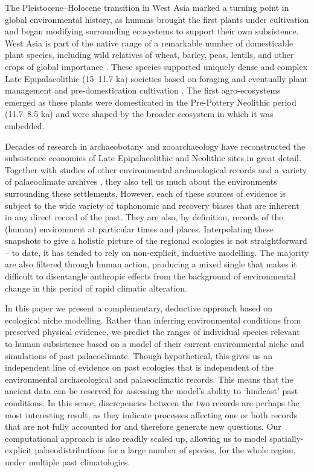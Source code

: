 \documentclass[
  authoryear,
  preprint]{elsarticle}
\begin{document}
The Pleistocene--Holocene transition in West Asia marked a turning point
in global environmental history, as humans brought the first plants
under cultivation and began modifying surrounding ecosystems to support
their own subsistence. West Asia is part of the native range of a
remarkable number of domesticable plant species, including wild
relatives of wheat, barley, peas, lentils, and other crops of global
importance \citep{HarlanZohary1966, Diamond2002, ZoharyEtAl2012}. These
species supported uniquely dense and complex Late Epipalaeolithic
(15--11.7 ka) societies \citep{BarYosef1998, MaherEtAl2012} based on
foraging \citep{HarrisHillman1989, Colledge2001, WeissEtAl2004} and
eventually plant management and pre-domestication cultivation
\citep{Colledge2001, WeissEtAl2006, Harris2007, WillcoxEtAl2008}. The
first agro-ecosystems emerged as these plants were domesticated in the
Pre-Pottery Neolithic period (11.7--8.5 ka) and were shaped by the
broader ecosystem in which it was embedded.

Decades of research in archaeobotany and zooarchaeology have
reconstructed the subsistence economies of Late Epipalaeolithic and
Neolithic sites in great detail. Together with studies of other
environmental archaeological records and a variety of palaeoclimate
archives \citep{JonesEtAl2019}, they also tell us much about the
environments surrounding these settlements. However, each of these
sources of evidence is subject to the wide variety of taphonomic and
recovery biases that are inherent in any direct record of the past. They
are also, by definition, records of the (human) environment at
particular times and places. Interpolating these snapshots to give a
holistic picture of the regional ecologies is not straightforward -- to
date, it has tended to rely on non-explicit, inductive modelling. The
majority are also filtered through human action, producing a mixed
single that makes it difficult to disentangle anthropic effects from the
background of environmental change in this period of rapid climatic
alteration.

In this paper we present a complementary, deductive approach based on
ecological niche modelling. Rather than inferring environmental
conditions from preserved physical evidence, we predict the ranges of
individual species relevant to human subsistence based on a model of
their current environmental niche and simulations of past palaeoclimate.
Though hypothetical, this gives us an independent line of evidence on
past ecologies that is independent of the environmental archaeological
and palaeoclimatic records. This means that the ancient data can be
reserved for assessing the model's ability to `hindcast' past
conditions. In this sense, discrepencies between the two records are
perhaps the most interesting result, as they indicate processes
affecting one or both records that are not fully accounted for and
therefore generate new questions. Our computational approach is also
readily scaled up, allowing us to model spatially-explicit
palaeodistributions for a large number of species, for the whole region,
under multiple past climatologies.
\end{document}
